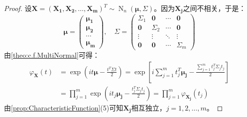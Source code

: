 \begin{proof}
	设$\mathbf{X}=(\mathbf{X_1},\mathbf{X_2},\dots,\mathbf{X_m})^T\sim\operatorname{N}_n(\boldsymbol{\mu},\Sigma)$。因为$\mathbf{X_j}$之间不相关，于是：
	\begin{equation*}
		\boldsymbol{\mu}=
		\begin{pmatrix}
			\boldsymbol{\mu_1} \\
			\boldsymbol{\mu_2} \\
			\cdots \\
			\boldsymbol{\mu_m}
		\end{pmatrix},\quad
		\Sigma=
		\begin{pmatrix}
			\Sigma_1 & \mathbf{0} & \cdots & \mathbf{0} \\
			\mathbf{0} & \Sigma_2 & \cdots & \mathbf{0} \\
			\vdots & \vdots & \ddots & \vdots \\
			\mathbf{0} & \mathbf{0} & \cdots & \Sigma_m
		\end{pmatrix}
	\end{equation*}
	由\cref{theo:c.f.MultiNormal}可得：
	\begin{align*}
		\varphi_\mathbf{X}(t)
		&=\exp\left(it\boldsymbol{\mu}-\frac{t^T\Sigma t}{2}\right)
		=\exp\left[i\sum_{j=1}^{m}t_j^T\boldsymbol{\mu_j}-\frac{\sum\limits_{j=1}^{m}t_j^T\Sigma_j t_j}{2}\right] \\
		&=\prod_{j=1}^m\exp\left(it_j\boldsymbol{\mu_j}-\frac{t_j^T\Sigma_j t_j}{2}\right)=\prod_{j=1}^m\varphi_\mathbf{X_j}(t_j)
	\end{align*}
	由\cref{prop:CharacteristicFunction}(5)可知$\mathbf{X_j}$相互独立，$j=1,2,\dots,m$。
\end{proof}

